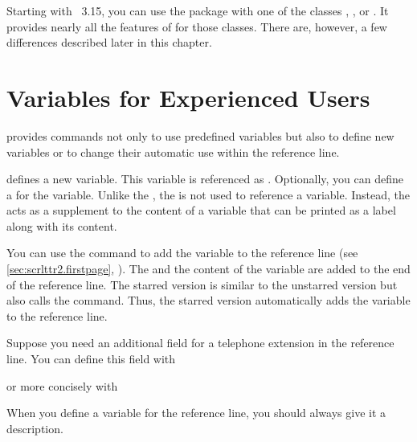 %
Starting with \KOMAScript~3.15,
you can use the  package with one of the \KOMAScript{}
classes , , or . It provides
nearly all the features of  for those classes. There are,
however, a few differences described later in this chapter.%


\section{Variables for Experienced Users}
\BeginIndexGroup
{}

\KOMAScript{} provides commands not only to use predefined variables but also
to define new variables or to change their automatic use within the reference
line.

\begin{Declaration}
\end{Declaration}
 defines a new variable. This variable is referenced as
. Optionally, you can define a  for the
 variable. Unlike the , the  is not
used to reference a variable. Instead, the  acts as a
supplement to the content of a variable that can be printed as a label along
with its content.

You can use the  command to add the 
variable to the reference line (see
\autoref{sec:scrlttr2.firstpage}, ). The
 and the content of the variable are added to the end of
the reference line. The starred version  is similar to the
unstarred version but also calls the  command. Thus, the
starred version automatically adds the variable to the reference line.
\begin{Example}
  Suppose you need an additional field for a telephone extension in the
  reference line. You can define this field with
\begin{lstcode}
\end{lstcode}
  or more concisely with
\begin{lstcode}
\end{lstcode}
\end{Example}
When you define a variable for the reference line, you
should always give it a description.

